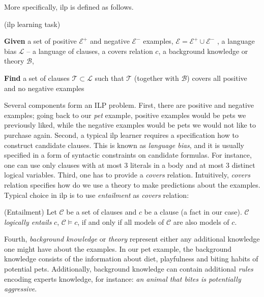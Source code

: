 More specifically, \gls{ilp} is defined as follows.

\begin{definition}{(\gls{ilp} learning task)}
	
	
\textbf{Given}
 a set of positive $\mathcal{E}^+$ and negative $\mathcal{E}^-$ examples, $\mathcal{E} = \mathcal{E}^+ \cup \mathcal{E}^-$ ,
 a language bias $\mathcal{L}$ -- a language of clauses,
 a covers relation $c$,
 a background knowledge or theory $\mathcal{B}$,


\textbf{Find} a set of clauses $\mathcal{T} \subset \mathcal{L}$ such that $\mathcal{T}$ (together with $\mathcal{B}$) covers all positive and no negative examples

\end{definition}



Several components form an ILP problem.
First, there are positive and negative examples; going back to our \textit{pet} example, positive examples would be pets we previously liked, while the negative examples would be pets we would not like to purchase again.
Second, a typical \gls{ilp} learner requires a specification how to construct candidate clauses.
This is known as \textit{language bias}, and it is usually specified in a form of syntactic constraints on candidate formulas.
For instance, one can use only clauses with at most 3 literals in a body and at most 3 distinct logical variables.
Third, one has to provide a \textit{covers} relation.
Intuitively, \textit{covers} relation specifies how do we use a theory to make predictions about the examples.
Typical choice in \gls{ilp} is to use \textit{entailment} as \textit{covers} relation:

\begin{definition}{(Entailment)}
	Let $\mathcal{C}$ be a set of clauses and $c$ be a clause (a fact in our case). $\mathcal{C}$ \textit{logically entails} $c$, $\mathcal{C} \models c$, if and only if all models of $\mathcal{C}$ are also models of $c$. 
\end{definition}
Fourth, \textit{background knowledge} or \textit{theory} represent either any additional knowledge one might have about the examples.
In our pet example, the background knowledge consists of the information about diet, playfulness and biting habits of potential pets.
Additionally, background knowledge can contain additional \textit{rules} encoding experts knowledge, for instance: \textit{an animal that bites is potentially aggressive}.




